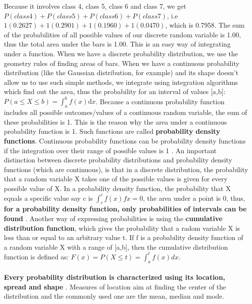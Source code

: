 \documentclass {article}
\begin{document}
 Because it involves class 4, class 5, class 6 and class 7, we get $P(class 4)+P(class 5)+P(class 6)+P(class 7)$, i.e $1(0.2627) + 1(0.2901) + 1(0.1960) + 1(0.0470)$, which is 0.7958.
 The sum of the probabilities of all possible values of our discrete random variable is 1.00, thus the total area under the bars is 1.00.
 This is an easy way of integrating under a function.
 When we have a discrete probability distribution, we use the geometry rules of finding areas of bars.
 When we have a continuous probability distribution (like the Gaussian distribution, for example) and its shape doesn't allow us to use such simple methods, we integrate using integration algorithms which find out the area, thus the probability for an interval of values [a,b]: $P(a \leq X \leq b)=\int^b_a f(x) \mathrm{d}x$\cite{lial_calculus_2012}.
 Because a continuous probability function includes all possible outcomes/values of a continuous random variable, the sum of these probabilities is 1.
 This is the reason why the area under a continuous probability function is 1. Such functions are called \textbf{probability density functions}. 
Continuous probability functions can be probability density functions if the integration over their range of possible values is 1 \cite{lial_calculus_2012}. 
An important distinction between discrete probability distributions and probability density functions (which are continuous), is that in a discrete distribution, the probability that a random variable X takes one of the possible values is given for every possible value of X. In a probability density function, the probability that X equals a specific value say c is $\int^c_c f(x) fx = 0$, the area under a point is 0, thus, \textbf{for a probability density function, only probabilities of intervals can be found} \cite{lial_calculus_2012}.
Another way of expressing probabilities is using the \textbf{cumulative distribution function}, which gives the probability that a radom variable X is less than or equal to an arbitrary value t. If f is a probability density function of a random variable X with a range of [a,b], then the cumulative distribution function is defined as: $F(x)=P(X \leq t)=\int^t_a f(x) dx$.                    
\\
\\
\textbf{Every probability distribution is characterized using its location, spread and shape} \cite{quinn_experimental_2002} \cite{isaaks_applied_1989} \cite{webster_geostatistics_2007}.
 Measures of location aim at finding the center of the distribution and the commonly used one are the mean, median and mode. 
\end{document}
